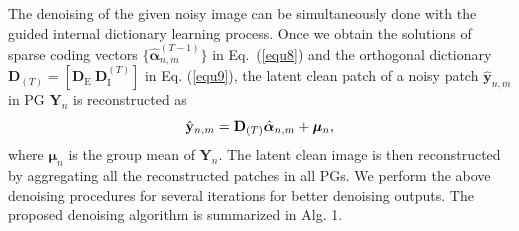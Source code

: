 \documentclass[10pt,twocolumn,letterpaper]{article}
\begin{document}
The denoising of the given noisy image can be simultaneously done with the guided internal dictionary learning process. Once we obtain the solutions of sparse coding vectors $\{\hat{\bm{\alpha}}_{n,m}^{(T-1)}\}$ in Eq.\ (\ref{equ8}) and the orthogonal dictionary $\mathbf{D}_{(T)} = [\mathbf{D}_{\text{E}}\ \mathbf{D}_{\text{I}}^{(T)}]$ in Eq. (\ref{equ9}), the latent clean patch of a noisy patch $\hat{\mathbf{y}}_{n,m}$ in PG $\mathbf{Y}_{n}$ is reconstructed as
\vspace{-2mm}
\begin{equation}\label{equ11}\vspace{-2mm}
\hat{\mathbf{y}}_{n,m}=\mathbf{D}_{(T)}\hat{\bm{\alpha}}_{n,m}+\bm{\mu}_{n},
\end{equation}
where $\bm{\mu}_{n}$ is the group mean of $\mathbf{Y}_{n}$. The latent clean image is then reconstructed by aggregating all the reconstructed patches in all PGs. We perform the above denoising procedures for several iterations for better denoising outputs. The proposed denoising algorithm is summarized in Alg. 1.
\end{document}
